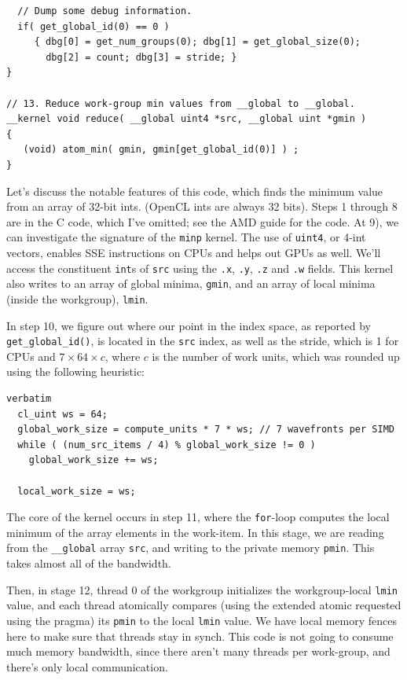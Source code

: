 {\begin{lstlisting}
  // Dump some debug information.                             
  if( get_global_id(0) == 0 )
     { dbg[0] = get_num_groups(0); dbg[1] = get_global_size(0); 
       dbg[2] = count; dbg[3] = stride; }
}
                                                               
// 13. Reduce work-group min values from __global to __global. 
__kernel void reduce( __global uint4 *src, __global uint *gmin )                    
{                                                              
   (void) atom_min( gmin, gmin[get_global_id(0)] ) ;           
}                                                              
\end{lstlisting}
}

Let's discuss the notable features of this code, which finds the
minimum value from an array of 32-bit ints. (OpenCL ints are always 32
bits). Steps 1 through 8 are in the C code, which I've omitted; see
the AMD guide for the code. At 9), we can investigate the signature of
the {\tt minp} kernel. The use of {\tt uint4}, or 4-int vectors,
enables SSE instructions on CPUs and helps out GPUs as well. We'll
access the constituent {\tt int}s of {\tt src} using the {\tt .x},
{\tt .y}, {\tt .z} and {\tt .w} fields.  This kernel also writes to an
array of global minima, {\tt gmin}, and an array of local minima
(inside the workgroup), {\tt lmin}.

In step 10, we figure out where our point in the index space, as
reported by {\tt get\_global\_id()}, is located in the {\tt src}
index, as well as the stride, which is 1 for CPUs and $7 \times 64
\times c$, where $c$ is the number of work units, which was rounded up
using the following heuristic:

{
\begin{lstlisting}verbatim
  cl_uint ws = 64;
  global_work_size = compute_units * 7 * ws; // 7 wavefronts per SIMD
  while ( (num_src_items / 4) % global_work_size != 0 )
    global_work_size += ws;

  local_work_size = ws;
\end{lstlisting}
}


The core of the kernel occurs in step 11, where the {\tt for}-loop
computes the local minimum of the array elements in the work-item.  In
this stage, we are reading from the {\tt \_\_global} array {\tt src},
and writing to the private memory {\tt pmin}. This takes almost all of
the bandwidth. 

Then, in stage 12, thread 0 of the workgroup initializes the
workgroup-local {\tt lmin} value, and each thread atomically compares
(using the extended atomic requested using the pragma) its {\tt pmin}
to the local {\tt lmin} value.  We have local memory fences here to
make sure that threads stay in synch.  This code is not going to
consume much memory bandwidth, since there aren't many threads per
work-group, and there's only local communication.

